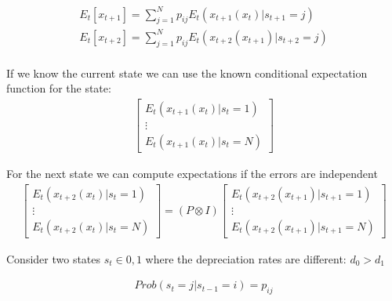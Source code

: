 \documentclass[12pt]{article}
\begin{document}
\begin{gather*}
E_t[x_{t+1}]=  \sum_{j=1}^{N} p_{ij} E_t(x_{t+1}(x_t)|s_{t+1}=j)  \\
E_t[x_{t+2}]=  \sum_{j=1}^{N} p_{ij} E_t(x_{t+2}(x_{t+1})|s_{t+2}=j)  \\
\end{gather*}

If we know the current state we can use the known conditional expectation function for the state:
\begin{gather*}
    \begin{bmatrix}
E_t(x_{t+1}(x_{t})|s_{t}=1)  \\    \vdots \\
E_t(x_{t+1}(x_{t})|s_{t}=N)  
  \end{bmatrix}
\end{gather*}

For the next state we can compute expectations if the errors are independent
\begin{gather*}
  \begin{bmatrix}
E_t(x_{t+2}(x_t)|s_{t}=1)  \\    \vdots \\
E_t(x_{t+2}(x_t)|s_{t}=N)  
  \end{bmatrix}=
(P \otimes  I)
  \begin{bmatrix}
E_t(x_{t+2}(x_{t+1})|s_{t+1}=1)  \\    \vdots \\
E_t(x_{t+2}(x_{t+1})|s_{t+1}=N)  
  \end{bmatrix}
\end{gather*}

Consider two states $s_t \in {0,1}$ where the depreciation rates are different:  $d_0>d_1$

\begin{gather}
    Prob(s_t=j|s_{t-1}=i)=p_{ij}
\end{gather}
\end{document}
